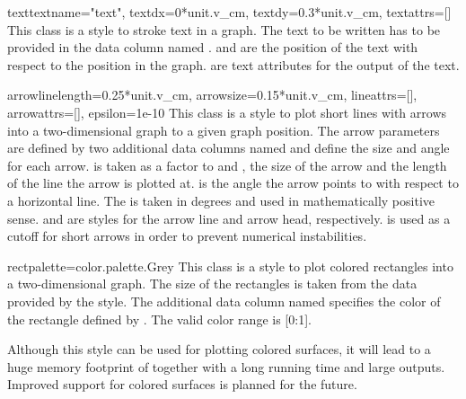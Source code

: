 \begin{classdesc}{text}{textname="text", %
                        textdx=0*unit.v\_cm, textdy=0.3*unit.v\_cm,
                        textattrs=[]}
  This class is a style to stroke text in a graph. The
  text to be written has to be provided in the data column named
  .  and  are the position of the
  text with respect to the position in the graph.  are text
  attributes for the output of the text.
\end{classdesc} %

\begin{classdesc}{arrow}{linelength=0.25*unit.v\_cm, %
                         arrowsize=0.15*unit.v\_cm,
                         lineattrs=[], arrowattrs=[],
                         epsilon=1e-10}
  This class is a style to plot short lines with arrows into a
  two-dimensional graph to a given graph position. The arrow
  parameters are defined by two additional data columns named
   and  define the size and angle for each
  arrow.  is taken as a factor to  and
  , the size of the arrow and the length of the line
  the arrow is plotted at.  is the angle the arrow points
  to with respect to a horizontal line. The  is taken in
  degrees and used in mathematically positive sense. 
  and  are styles for the arrow line and arrow head,
  respectively.  is used as a cutoff for short arrows in
  order to prevent numerical instabilities.
\end{classdesc} %

\begin{classdesc}{rect}{palette=color.palette.Grey} %
  This class is a style to plot colored rectangles into a
  two-dimensional graph. The size of the rectangles is taken from
  the data provided by the  style. The additional
  data column named  specifies the color of the rectangle
  defined by . The valid color range is [0:1].

  \begin{note}
    Although this style can be used for plotting colored surfaces, it
    will lead to a huge memory footprint of \PyX{} together with a
    long running time and large outputs. Improved support for colored
    surfaces is planned for the future.
  \end{note}
\end{classdesc} %

